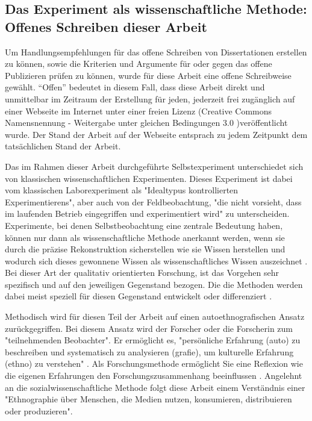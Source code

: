 \subsection{Das Experiment als wissenschaftliche Methode: Offenes Schreiben dieser Arbeit}

Um Handlungsempfehlungen für das offene Schreiben von Dissertationen erstellen zu können, sowie die Kriterien und Argumente für oder gegen das offene Publizieren prüfen zu können, wurde für diese Arbeit eine offene Schreibweise gewählt. “Offen” bedeutet in diesem Fall, dass diese Arbeit direkt und unmittelbar im Zeitraum der Erstellung für jeden, jederzeit frei zugänglich auf einer Webseite im Internet unter einer freien Lizenz (Creative Commons Namensnennung - Weitergabe unter gleichen Bedingungen 3.0 \cite{cc_by_sa_2008})veröffentlicht wurde. Der Stand der Arbeit auf der Webseite entsprach zu jedem Zeitpunkt dem tatsächlichen Stand der Arbeit.

Das im Rahmen dieser Arbeit durchgeführte Selbstexperiment unterschiedet sich von klassischen wissenschaftlichen Experimenten. Dieses Experiment ist dabei vom klassischen Laborexperiment als "Idealtypus kontrollierten Experimentierens", aber auch von der Feldbeobachtung, "die nicht vorsieht, dass im laufenden Betrieb eingegriffen und experimentiert wird" \cite{FQS196} zu unterscheiden. Experimente, bei denen Selbstbeobachtung eine zentrale Bedeutung haben, können nur dann als wissenschaftliche Methode anerkannt werden, wenn sie durch die präzise Rekonstruktion sicherstellen wie sie Wissen herstellen und wodurch sich dieses gewonnene Wissen als wissenschaftliches Wissen auszeichnet \cite{solhdju_2011_selbstexperimente}. Bei dieser Art der qualitativ orientierten Forschung, ist das Vorgehen sehr spezifisch und auf den jeweiligen Gegenstand bezogen. Die die Methoden werden dabei meist speziell für diesen Gegenstand entwickelt oder differenziert \cite{Mayring_1999:119}.

Methodisch wird für diesen Teil der Arbeit auf einen autoethnografischen Ansatz zurückgegriffen. Bei diesem Ansatz wird der Forscher oder die Forscherin zum "teilnehmenden Beobachter"\cite{Ellis_2010}. Er ermöglicht es, "persönliche Erfahrung (auto) zu beschreiben und systematisch zu analysieren (grafie), um kulturelle Erfahrung (ethno) zu verstehen" \cite{Ellis_2010}. Als Forschungsmethode ermöglicht Sie eine Reflexion wie die eigenen Erfahrungen den Forschungszusammenhang beeinflussen \cite{ellis_2011_autoethnography}. Angelehnt an die sozialwissenschaftliche Methode folgt diese Arbeit einem Verständnis einer "Ethnographie über Menschen, die Medien nutzen, konsumieren, distribuieren oder produzieren"\cite{bachmann_2011_ethnographie}.

